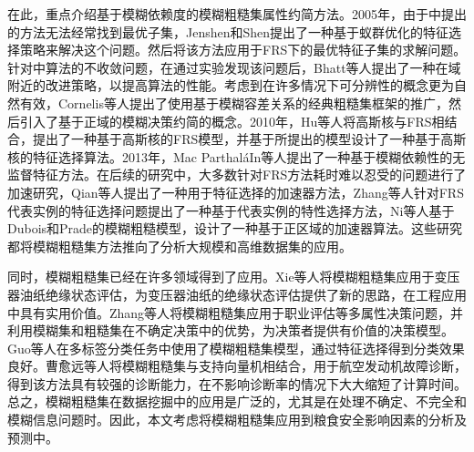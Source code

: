 在此，重点介绍基于模糊依赖度的模糊粗糙集属性约简方法。2005年，由于\cite{2004Fuzzy}中提出的方法无法经常找到最优子集，Jenshen和Shen\cite{2005Fuzzy}提出了一种基于蚁群优化的特征选择策略来解决这个问题。然后将该方法应用于FRS下的最优特征子集的求解问题。针对\cite{2004Fuzzy}中算法的不收敛问题，在通过实验发现该问题后，Bhatt等人\cite{2005On,2005compact}提出了一种在域附近的改进策略，以提高算法的性能。考虑到在许多情况下可分辨性的概念更为自然有效，Cornelis等人\cite{2010Feature}提出了使用基于模糊容差关系的经典粗糙集框架的推广，然后引入了基于正域的模糊决策约简的概念。2010年，Hu等人\cite{2010Gaussian}将高斯核与FRS相结合，提出了一种基于高斯核的FRS模型，并基于所提出的模型设计了一种基于高斯核的特征选择算法。2013年，Mac ParthaláIn等人\cite{mac2013unsupervised}提出了一种基于模糊依赖性的无监督特征方法。在后续的研究中，大多数针对FRS方法耗时难以忍受的问题进行了加速研究，Qian等人\cite{qian2015fuzzy}提出了一种用于特征选择的加速器方法，Zhang等人\cite{zhang2018fuzzy}针对FRS代表实例的特征选择问题提出了一种基于代表实例的特性选择方法，Ni等人\cite{ni2019positive}基于Dubois和Prade的模糊粗糙模型，设计了一种基于正区域的加速器算法。这些研究都将模糊粗糙集方法推向了分析大规模和高维数据集的应用。


同时，模糊粗糙集已经在许多领域得到了应用。Xie等人\cite{xie2017evaluation}将模糊粗糙集应用于变压器油纸绝缘状态评估，为变压器油纸的绝缘状态评估提供了新的思路，在工程应用中具有实用价值。Zhang等人\cite{ZHANGChao1531}将模糊粗糙集应用于职业评估等多属性决策问题，并利用模糊集和粗糙集在不确定决策中的优势，为决策者提供有价值的决策模型。Guo等人\cite{rongchao2017fuzzy}在多标签分类任务中使用了模糊粗糙集模型，通过特征选择得到分类效果良好。曹愈远等人\cite{曹愈远2017基于模糊粗糙集}将模糊粗糙集与支持向量机相结合，用于航空发动机故障诊断，得到该方法具有较强的诊断能力，在不影响诊断率的情况下大大缩短了计算时间。总之，模糊粗糙集在数据挖掘中的应用是广泛的，尤其是在处理不确定、不完全和模糊信息问题时\cite{duan2020energy}。因此，本文考虑将模糊粗糙集应用到粮食安全影响因素的分析及预测中。

